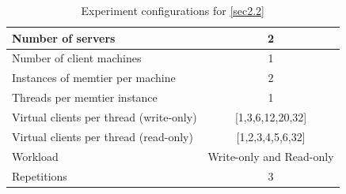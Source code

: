 \documentclass[11pt,a4paper]{article}
\begin{document}
\begin{table}
    \centering
	\begin{tabular}{|l|c|}
		\hline Number of servers                        & 2                        \\ 
		\hline Number of client machines                & 1                        \\ 
		\hline Instances of memtier per machine         & 2                        \\ 
		\hline Threads per memtier instance             & 1                        \\
		\hline Virtual clients per thread (write-only)  & [1,3,6,12,20,32]         \\ 
		\hline Virtual clients per thread (read-only)   & [1,2,3,4,5,6,32]         \\ 
		\hline Workload                                 & Write-only and Read-only \\
		\hline Repetitions                              & 
		3                        \\ 
		\hline 
	\end{tabular}
	\caption{Experiment configurations for \autoref{sec2.2}} \label{exp2-2}
\end{table}
\end{document}
